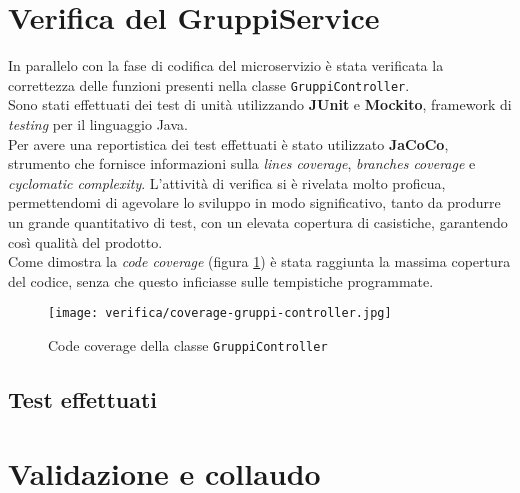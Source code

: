 \section{Verifica del GruppiService}
In parallelo con la fase di codifica del \gls{microservizio}  è stata verificata la correttezza delle funzioni presenti nella classe \texttt{GruppiController}. \\
Sono stati effettuati dei test di unità utilizzando \textbf{JUnit} e \textbf{Mockito}, \gls{framework} di \textit{testing} per il linguaggio Java.\\
Per avere una reportistica dei test effettuati è stato utilizzato \textbf{JaCoCo}, strumento che fornisce informazioni sulla \textit{lines coverage}, \textit{branches coverage} e \textit{cyclomatic complexity}. 
L'attività di verifica si è rivelata molto proficua, permettendomi di agevolare lo sviluppo in modo significativo, tanto da produrre un
grande quantitativo di test, con un elevata copertura di casistiche, garantendo così qualità del prodotto.\\
Come dimostra la \textit{code coverage} (figura \ref{img:code-coverage}) è stata raggiunta la massima copertura del codice, senza che questo inficiasse sulle tempistiche programmate.

\begin{figure}[H] 
    \centerline{\texttt{[image: verifica/coverage-gruppi-controller.jpg]}} 
    \caption{Code coverage della classe \texttt{GruppiController}}
    \label{img:code-coverage}
\end{figure}

\subsection{Test effettuati}







\section{Validazione e collaudo}


